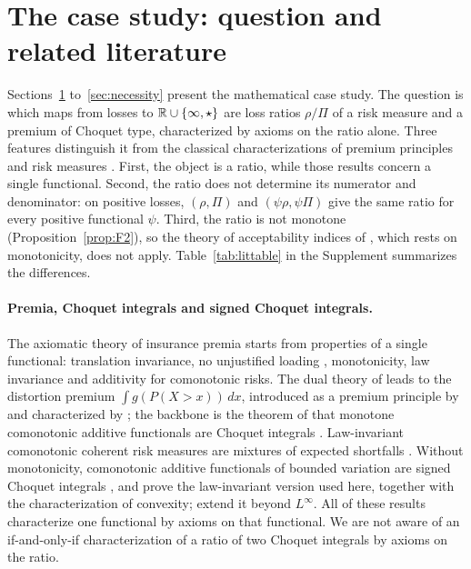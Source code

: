 \section{The case study: question and related literature}\label{sec:lit}

Sections~\ref{sec:lit} to~\ref{sec:necessity} present the mathematical case study. The question is which maps
from losses to $\mathbb R\cup\{\infty,\star\}$ are loss ratios $\rho/\Pi$ of a risk measure and a premium of Choquet type,
characterized by axioms on the ratio alone. Three features distinguish it from the classical characterizations of
premium principles and risk measures \citep{yaari1987,wyp1997,schmeidler1986,www2020}. First, the object is a ratio,
while those results concern a single functional. Second, the ratio does not determine its numerator and
denominator: on positive losses, $(\rho,\Pi)$ and $(\psi\rho,\psi\Pi)$ give the same ratio for every positive
functional $\psi$. Third, the ratio is not monotone (Proposition~\ref{prop:F2}), so the theory of acceptability
indices of \citet{chernymadan2009}, which rests on monotonicity, does not apply. Table~\ref{tab:littable} in the
Supplement summarizes the differences.

\paragraph{Premia, Choquet integrals and signed Choquet integrals.}
The axiomatic theory of insurance premia starts from properties of a single functional: translation invariance,
no unjustified loading \citep{gerber1974}, monotonicity, law invariance and additivity for comonotonic risks. The
dual theory of \citet{yaari1987} leads to the distortion premium $\int g(P(X>x))\,dx$, introduced as a premium
principle by \citet{wang1996} and characterized by \citet{wyp1997}; the backbone is the theorem of
\citet{schmeidler1986} that monotone comonotonic additive functionals are Choquet integrals \citep[see
also][]{greco1982,denneberg1994}. Law-invariant comonotonic coherent risk measures are mixtures of expected
shortfalls \citep{adeh1999,delbaen2002,kusuoka2001,jst2006,folmerschied2016}. Without monotonicity, comonotonic
additive functionals of bounded variation are signed Choquet integrals \citep{msm1994,cmmm2012,cmmm2015}, and
\citet{www2020} prove the law-invariant version used here, together with the characterization of convexity;
\citet{www2020b} extend it beyond $L^\infty$. All of these results characterize one functional by axioms on that
functional. We are not aware of an if-and-only-if characterization of a ratio of two Choquet integrals by axioms on
the ratio.


